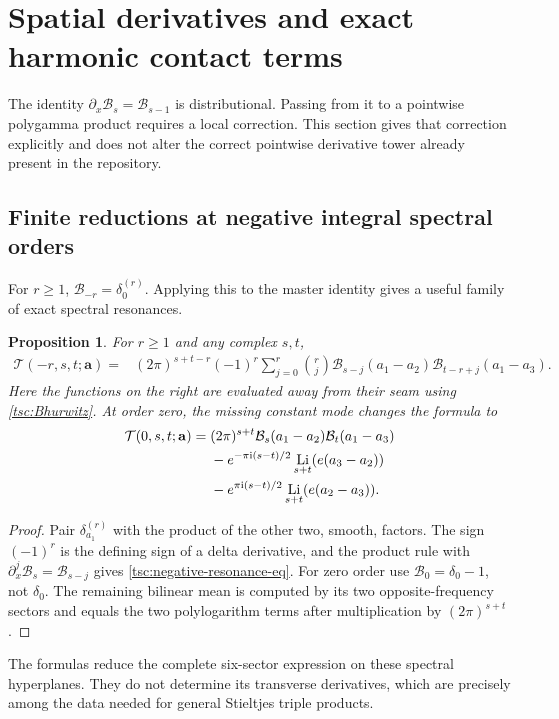 \documentclass[11pt]{article}
\numberwithin{equation}{section}
\newtheorem{proposition}[theorem]{Proposition}
\theoremstyle{definition}\newtheorem{definition}[theorem]{Definition}
\theoremstyle{remark}\newtheorem{remark}[theorem]{Remark}
\DeclareMathOperator{\Li}{Li}
\newcommand{\ii}{\mathrm i}
\newcommand{\calB}{\mathcal B}
\newcommand{\calT}{\mathcal T}
\begin{document}

\section{Spatial derivatives and exact harmonic contact terms}\label{tsc:contacts}
The identity $\partial_x\calB_s=\calB_{s-1}$ is distributional. Passing
from it to a pointwise polygamma product requires a local correction. This
section gives that correction explicitly and does not alter the correct
pointwise derivative tower already present in the repository.

\subsection{Finite reductions at negative integral spectral orders}
For $r\ge1$, $\calB_{-r}=\delta_0^{(r)}$. Applying this to the master
identity gives a useful family of exact spectral resonances.
\begin{proposition}\label{tsc:negative-resonance}
For $r\ge1$ and any complex $s,t$,
\begin{align}\label{tsc:negative-resonance-eq}
 \calT(-r,s,t;\mathbf a)
 ={}&(2\pi)^{s+t-r}(-1)^r
   \sum_{j=0}^r\binom rj
    \calB_{s-j}(a_1-a_2)\calB_{t-r+j}(a_1-a_3).
\end{align}
Here the functions on the right are evaluated away from their seam using
\eqref{tsc:Bhurwitz}. At order zero, the missing constant mode changes
the formula to
\begin{align}\label{tsc:zero-resonance}
 \calT(0,s,t;\mathbf a)={}&(2\pi)^{s+t}
    \calB_s(a_1-a_2)\calB_t(a_1-a_3)\notag\\
 &-e^{-\pi\ii(s-t)/2}\Li_{s+t}(e(a_3-a_2))\notag\\
 &-e^{\pi\ii(s-t)/2}\Li_{s+t}(e(a_2-a_3)).
\end{align}
\end{proposition}
\begin{proof}
Pair $\delta_{a_1}^{(r)}$ with the product of the other two, smooth,
factors. The sign $(-1)^r$ is the defining sign of a delta derivative,
and the product rule with $\partial_x^j\calB_s=\calB_{s-j}$ gives
\eqref{tsc:negative-resonance-eq}. For zero order use
$\calB_0=\delta_0-1$, not $\delta_0$. The remaining bilinear mean is
computed by its two opposite-frequency sectors and equals the two
polylogarithm terms after multiplication by $(2\pi)^{s+t}$.
\end{proof}
The formulas reduce the complete six-sector expression on these spectral
hyperplanes. They do not determine its transverse derivatives, which are
precisely among the data needed for general Stieltjes triple products.
\end{document}
